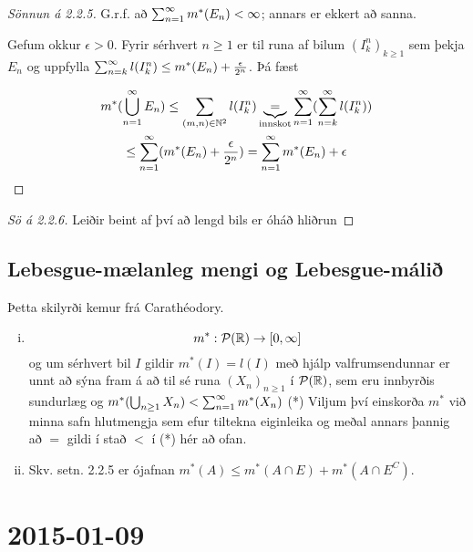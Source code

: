 \documentclass[12pt]{book}
\newcommand{\cP}{\mathcal{P}}
\begin{document}
\begin{proof}[Sönnun á 2.2.5]
  G.r.f. að $\sum_{n = 1}^{\infty} m^*(E_n) < \infty$; annars er ekkert að sanna.

      Gefum okkur $\epsilon > 0$. Fyrir sérhvert $n \geq 1$ er til runa af bilum
      $(I^n_k)_{k \geq 1}$ sem þekja $E_n$ og uppfylla
      $\sum_{n = {k}}^{\infty} l(I^n_k) \leq m^*(E_n) + \frac{\epsilon}{2^n}$. Þá fæst

      \begin{gather*}
        m^*(\bigcup_{n=1}^{\infty} E_n) \leq \sum_{(m,n) \in \mathbb{N}^2} l(I_k^n)
          \underbrace{=}_{\text{innskot}} \sum_{n = 1}^{\infty} (\sum_{n = {k}}^{\infty} l(I^n_k))\\
          \leq \sum_{n = 1}^{\infty} (m^*(E_n) + \frac{\epsilon}{2^n}) = \sum_{n = 1}^{\infty} m^*(E_n) + \epsilon
      \end{gather*}
        
\end{proof}
\begin{proof}[Sö á 2.2.6]
     Leiðir beint af því að lengd bils er óháð hliðrun 
\end{proof}

\section{Lebesgue-mælanleg mengi og Lebesgue-málið}

Þetta skilyrði kemur frá Carathéodory.

\begin{ath} 
  \begin{enumerate}[(i)] 
  \item \[m^*:  \cP(\R) \to [0, \infty] \]
    og um sérhvert bil $I$ gildir $m^{*}(I) = l(I)$
    með hjálp valfrumsendunnar er unnt að sýna fram á að til sé runa
    $(X_n)_{n\geq1}$ í $\cP(\R)$, sem eru innbyrðis sundurlæg og $m^*(\bigcup_{n\geq1}X_n) < \sum_{n = 1}^{\infty} m^*(X_n)$ (*)
    Viljum því einskorða $ m^* $ við minna safn hlutmengja sem efur tiltekna eiginleika og meðal annars þannig að $=$ gildi
    í stað $<$ í (*) hér að ofan.

  \item Skv. setn. 2.2.5 er ójafnan $m^*(A) \leq m^*(A\cap E) + m^*(A \cap E^C)$.
     
  \end{enumerate}
\end{ath}

\chapter{2015-01-09}
\end{document}
